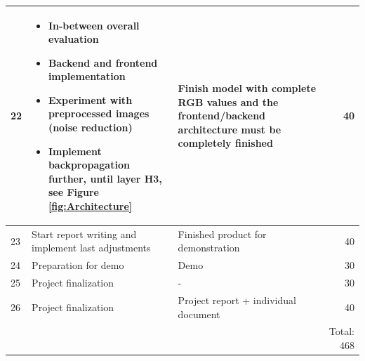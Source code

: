 \documentclass[a4paper,onecolumn]{report}
\begin{document}
\begin{center}
\begin{tabular}{| l | p{5cm}| p{5cm} | r | }
	22 & \begin{itemize} \vspace{-1.75em}
	\item In-between overall evaluation \vspace{-1em}
	\item Backend and frontend implementation\vspace{-1em}
	\item Experiment with preprocessed images (noise reduction) \vspace{-1em}
	\item Implement backpropagation further, until layer H3, see Figure \ref{fig:Architecture} \vspace{-1em}
	\end{itemize} & Finish model with complete RGB values and the frontend/backend architecture must be completely finished & 40 					\\  \hline
	23 & Start report writing and implement last adjustments & Finished product for demonstration & 40 	\\	\hline
	24 & Preparation for demo & Demo & 30				\\  \hline
    25 & Project finalization & - & 30 				\\ \hline
    26 & Project finalization & Project report + individual document & 40 \\ \hline
       & & & Total: 468  \\ \hline

    \hline
  \end{tabular}
\end{center}
\end{document}
